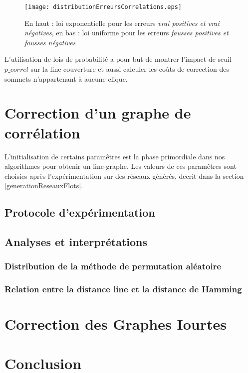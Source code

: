 \documentclass[onecolumn, 12pt]{book}
\begin{document}
\begin{figure}[htb!] 
\centering
\texttt{[image: distributionErreursCorrelations.eps]}
\caption{En haut : loi exponentielle pour les erreurs   {\em vrai positives et vrai n\'egatives}, en bas : loi uniforme pour les erreurs   {\em fausses positives et fausses n\'egatives} }
\label{distributionErreursCorrelations} 
\end{figure}

 
L'utilisation de lois de probabilit\'e a pour but de montrer l'impact de seuil $p\_correl$ sur la line-couverture et aussi calculer les co\^uts de correction des sommets n'appartenant \`a aucune clique.

\section{Correction d'un graphe de corr\'elation}
L'initialisation de certains param\^etres est la phase primordiale dans nos algorithmes pour obtenir un line-graphe. Les valeurs de ces param\^etres sont choisies apr\`es l'exp\'erimentation sur des r\'eseaux g\'en\'er\'es, decrit dans la section \ref{generationReseauxFlots}.

\subsection{Protocole d'exp\'erimentation}

\subsection{Analyses et interpr\'etations}

\subsubsection{Distribution de la m\'ethode de permutation al\'eatoire}

\subsubsection{Relation entre la distance line et la distance de Hamming}


\section{Correction des Graphes Iourtes}


\section{Conclusion}
\end{document}
